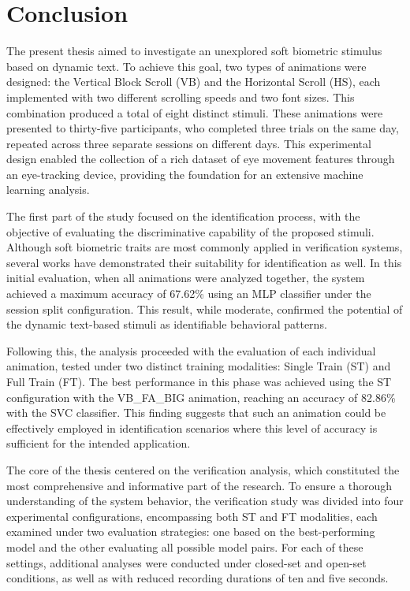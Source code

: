 \documentclass{article}
\begin{document}
\FloatBarrier


\section{Conclusion}

The present thesis aimed to investigate an unexplored soft biometric stimulus based on dynamic text. 
To achieve this goal, two types of animations were designed: the Vertical Block Scroll (VB) and the Horizontal Scroll (HS), each implemented with two different scrolling speeds and two font sizes.
This combination produced a total of eight distinct stimuli. 
These animations were presented to thirty-five participants, who completed three trials on the same day, repeated across three separate sessions on different days. 
This experimental design enabled the collection of a rich dataset of eye movement features through an eye-tracking device, providing the foundation for an extensive machine learning analysis.

The first part of the study focused on the identification process, with the objective of evaluating the discriminative capability of the proposed stimuli. 
Although soft biometric traits are most commonly applied in verification systems, several works have demonstrated their suitability for identification as well. 
In this initial evaluation, when all animations were analyzed together, the system achieved a maximum accuracy of 67.62\% using an MLP classifier under the session split configuration. 
This result, while moderate, confirmed the potential of the dynamic text-based stimuli as identifiable behavioral patterns.

Following this, the analysis proceeded with the evaluation of each individual animation, tested under two distinct training modalities: Single Train (ST) and Full Train (FT). 
The best performance in this phase was achieved using the ST configuration with the VB\_FA\_BIG animation, reaching an accuracy of 82.86\% with the SVC classifier. 
This finding suggests that such an animation could be effectively employed in identification scenarios where this level of accuracy is sufficient for the intended application.

The core of the thesis centered on the verification analysis, which constituted the most comprehensive and informative part of the research. 
To ensure a thorough understanding of the system behavior, the verification study was divided into four experimental configurations, encompassing both ST and FT modalities, each examined under two evaluation strategies: one based on the best-performing model and the other evaluating all possible model pairs. 
For each of these settings, additional analyses were conducted under closed-set and open-set conditions, as well as with reduced recording durations of ten and five seconds.
\end{document}
